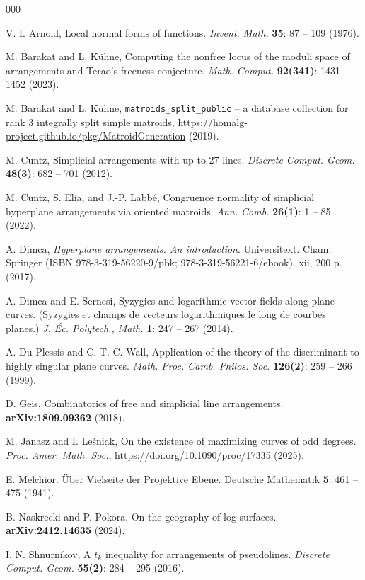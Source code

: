 \documentclass[12pt]{article}
\theoremstyle{plain}
\theoremstyle{definition}
\begin{document}
\begin{thebibliography}{000}

V. I. Arnold, Local normal forms of 
functions. \textit{Invent. Math.} 
\textbf{35}: 87 -- 109 (1976).

M. Barakat and L. K\"uhne,
Computing the nonfree locus of the moduli space of arrangements and Terao’s freeness conjecture. \textit{Math. Comput.} \textbf{92(341)}: 1431 -- 1452 (2023).

M. Barakat and L. K\"uhne, \verb}matroids_split_public} – a database collection for
rank 3 integrally split simple matroids, \url{https://homalg-project.github.io/pkg/MatroidGeneration} (2019).

M. Cuntz, Simplicial arrangements with up to 27 lines. \textit{Discrete Comput. Geom.} \textbf{48(3)}: 682 -- 701 (2012).

M. Cuntz, S. Elia, and J.-P. Labb\'e, 
Congruence normality of simplicial hyperplane arrangements via oriented matroids. \textit{Ann. Comb.} \textbf{26(1)}: 1 -- 85 (2022).

A. Dimca,  \textit{Hyperplane arrangements. An introduction}. Universitext. Cham: Springer (ISBN 978-3-319-56220-9/pbk; 978-3-319-56221-6/ebook). xii, 200 p. (2017).

A. Dimca and E. Sernesi, Syzygies and logarithmic vector fields along plane curves. (Syzygies et champs de vecteurs logarithmiques le long de courbes planes.) \textit{J. Éc. Polytech., Math.} \textbf{1}: 247 -- 267 (2014).

A. Du Plessis and C. T. C. Wall, Application of the theory of the discriminant to highly singular plane curves. \textit{Math. Proc. Camb. Philos. Soc.} \textbf{126(2)}: 259 -- 266 (1999).

D. Geis, Combinatorics of free and simplicial line arrangements. \textbf{arXiv:1809.09362} (2018).

 M. Janasz and I. Leśniak, On the existence of maximizing curves of odd degrees. 
\textit{Proc. Amer. Math. Soc.}, \url{https://doi.org/10.1090/proc/17335} (2025).

  E. Melchior. \"{U}ber Vielseite der Projektive Ebene. Deutsche Mathematik {\bf 5}: 461 – 475 (1941).

B. Naskrecki and P. Pokora, On the geography of log-surfaces. \textbf{arXiv:2412.14635} (2024).

I. N. Shnurnikov, A $t_{k}$ inequality for arrangements of pseudolines. \textit{Discrete Comput. Geom.} \textbf{55(2)}: 284 -- 295 (2016).
\end{thebibliography}
\end{document}
